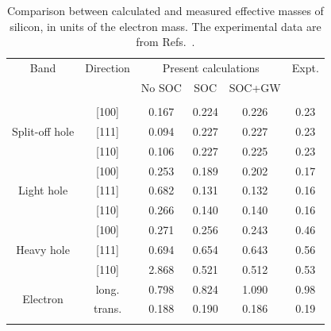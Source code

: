 \documentclass[aps,prl,twocolumn,superscriptaddress]{revtex4-1}
\begin{document}
\begin{table}
  \begin{tabular}{c c c c c c }
  \toprule
  Band & Direction & \multicolumn{3}{c}{Present calculations} & Expt. \\
  \multicolumn{2}{c}{}   & No SOC & SOC & SOC+GW &     \\
  \hline\\[-8pt]
  \multirow{3}{*}{Split-off hole}
  & [100]                & 0.167  & 0.224 &  0.226 &  0.23  \\
  & [111]                & 0.094  & 0.227 &  0.227 &  0.23  \\
  & [110]                & 0.106  & 0.227 &  0.225 &  0.23  \\
  \multirow{3}{*}{Light hole}
  & [100]                & 0.253  & 0.189 &  0.202 &  0.17 \\
  & [111]                & 0.682  & 0.131 &  0.132 &  0.16 \\
  & [110]                & 0.266  & 0.140 &  0.140 &  0.16 \\
  \multirow{3}{*}{Heavy hole}
  & [100]                & 0.271  & 0.256 &  0.243 &  0.46 \\
  & [111]                & 0.694  & 0.654 &  0.643 &  0.56 \\
  & [110]                & 2.868  & 0.521 &  0.512 &  0.53 \\
  \multirow{2}{*}{Electron}  
          & long.  & 0.798  & 0.824 &  1.090  & 0.98 \\ 
          & trans. & 0.188  & 0.190 &  0.186  & 0.19 \\
  \botrule 
  \end{tabular}
  \caption{\label{table1}
  Comparison between calculated and measured effective masses of silicon, in units of the electron mass.
  The experimental data are from Refs.~.
  }
\end{table}
\end{document}
